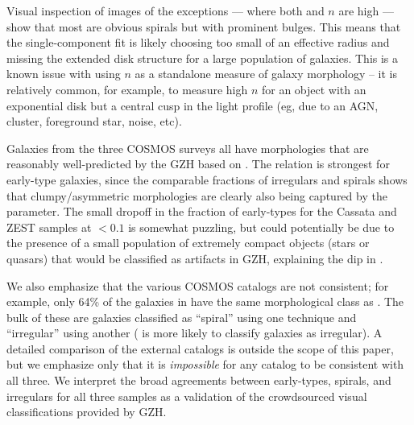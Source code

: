 \documentclass[twocolumn]{aastex6}
\begin{document}
Visual inspection of images of the exceptions --- where both \fbest{} and $n$
are high --- show that most are obvious spirals but with prominent bulges. This
means that the single-component \sersic{} fit is likely choosing too small of
an effective radius and missing the extended disk structure for a large
population of galaxies. This is a known issue with using $n$ as a standalone
measure of galaxy morphology -- it is relatively common, for example, to
measure high $n$ for an object with an exponential disk but a central cusp in
the light profile (eg, due to an AGN, cluster, foreground star, noise, etc).

Galaxies from the three COSMOS surveys all have morphologies that are
reasonably well-predicted by the GZH based on \fbest. The relation is strongest
for early-type galaxies, since the comparable fractions of irregulars and
spirals shows that clumpy/asymmetric morphologies are clearly also being
captured by the \fbest{} parameter. The small dropoff in the fraction of
early-types for the Cassata and ZEST samples at \fbest$<0.1$ is somewhat
puzzling, but could potentially be due to the presence of a small
population of extremely compact objects (stars or quasars) that would be
classified as artifacts in GZH, explaining the dip in \fbest.

We also emphasize that the various COSMOS catalogs are not consistent; for
example, only 64\% of the galaxies in \citet{tas11} have the same morphological
class as \citet{cas07}. The bulk of these are galaxies classified as ``spiral''
using one technique and ``irregular'' using another (\citealt{cas07} is more
likely to classify galaxies as irregular).  A detailed comparison of the
external catalogs is outside the scope of this paper, but we emphasize only
that it is \emph{impossible} for any catalog to be consistent with all three.
We interpret the broad agreements between early-types, spirals, and irregulars
for all three samples as a validation of the crowdsourced visual
classifications provided by GZH.
\end{document}
